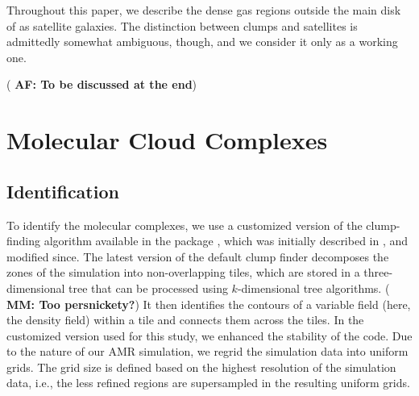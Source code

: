 \IfFileExists{emulateapjlegacy.cls}{\documentclass[iop]{emulateapjlegacy}}{\documentclass[iop]{emulateapj}}
\newcommand{\AF}[1]{({\bf \color{afcolor} AF: #1})}
\newcommand{\MM}[1]{({\bf \color{mmcolor} MM: #1})}
\begin{document}
Throughout this paper, we 
     describe  the dense gas regions outside the main disk of \flower
     as satellite galaxies.
The distinction between clumps and satellites is admittedly somewhat
ambiguous, though, and we consider it only as a working one.

\AF{To be discussed at the end}

\section{Molecular Cloud Complexes}\label{sec:eqn}

\subsection{Identification}\label{sec:method}

To identify the molecular complexes, we use a customized version of
the clump-finding algorithm available in the  package
 \citep{Turk11a}, which was initially described in
\citet{Smith09a}, 
     and modified since.
The latest version of the default  clump finder decomposes
the zones of the simulation into non-overlapping tiles, which are
stored in a 
     three-dimensional tree that can be processed using $k$-dimensional tree algorithms.
     \MM{Too persnickety?} 
It then identifies the contours of a variable field (here, the density
field) within a tile and connects them across the tiles. In the
customized version used for this study, we
     enhanced
the stability of the code.
%
Due to the nature of our AMR simulation, we regrid the simulation data into uniform grids. The grid size is defined based on the highest resolution of the simulation data, i.e., the less refined regions are supersampled in the resulting uniform grids.
\end{document}
